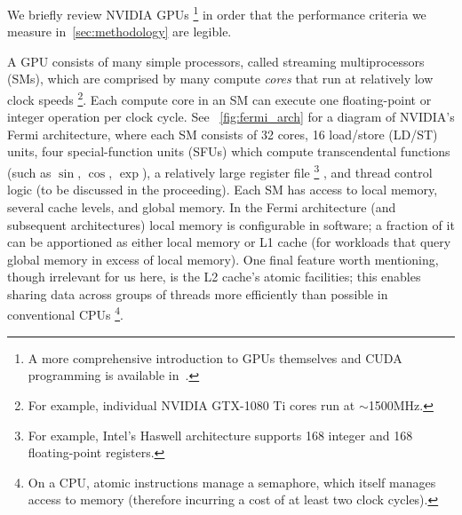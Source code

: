 We briefly review NVIDIA GPUs%
\footnote{A more comprehensive introduction to GPUs themselves and CUDA programming is available in~\cite{10.5555/1891996}.}
in order that the performance criteria we measure in~\cref{sec:methodology} are legible.

A GPU consists of many simple processors, called streaming multiprocessors (SMs), which are comprised by many compute \textit{cores} that run at relatively low clock speeds%
\footnote{For example, individual NVIDIA GTX-1080 Ti cores run at $\sim$1500MHz.}.
Each compute core in an SM can execute one floating-point or integer operation per clock cycle.
See ~\cref{fig:fermi_arch} for a diagram of NVIDIA's Fermi architecture, where each SM consists of 32 cores, 16 load/store (LD/ST) units, four special-function units (SFUs) which compute transcendental functions (such as $\sin$, $\cos$, $\exp$), a relatively large register file%
\footnote{For example, Intel's Haswell architecture supports 168 integer and 168 floating-point registers.}%
, and thread control logic (to be discussed in the proceeding).
Each SM has access to local memory, several cache levels, and global memory.
In the Fermi architecture (and subsequent architectures) local memory is configurable in software;
a fraction of it can be apportioned as either local memory or L1 cache (for workloads that query global memory in excess of local memory).
One final feature worth mentioning, though irrelevant for us here, is the L2 cache's atomic  facilities;
this enables sharing data across groups of threads more efficiently than possible in conventional CPUs%
\footnote{On a CPU, atomic  instructions manage a semaphore, which itself manages access to memory (therefore incurring a cost of at least two clock cycles).}.

